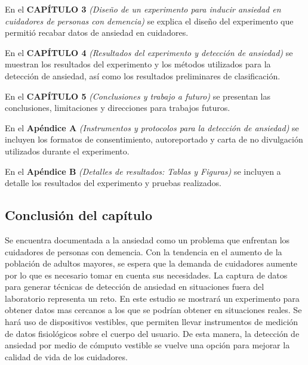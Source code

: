 	En el \textbf{CAP\'ITULO 3} \textit{(Dise\~no de un experimento para inducir ansiedad en cuidadores de personas con demencia)} se explica el dise\~no del experimento que permiti\'o recabar datos de ansiedad en cuidadores.

	En el \textbf{CAP\'ITULO 4} \textit{(Resultados del experimento y detecci\'on de ansiedad)} se muestran los resultados del experimento y los m\'etodos utilizados para la detecci\'on de ansiedad, as\'i como los resultados preliminares de clasificaci\'on.

	En el \textbf{CAP\'ITULO 5} \textit{(Conclusiones y trabajo a futuro)} se presentan las conclusiones, limitaciones y direcciones para trabajos futuros.

	En el \textbf{Ap\'endice A} \textit{(Instrumentos y protocolos para la detecci\'on de ansiedad)} se incluyen los formatos de consentimiento, autoreportado y carta de no divulgaci\'on utilizados durante el experimento.

	En el \textbf{Ap\'endice B} \textit{(Detalles de resultados: Tablas y Figuras)} se incluyen a detalle los resultados del experimento y pruebas realizados.


\subsection{Conclusi\'on del cap\'itulo}
	Se encuentra documentada a la ansiedad como un problema que enfrentan los cuidadores de personas con demencia. Con la tendencia en el aumento de la poblaci\'on de adultos mayores, se espera que la demanda de cuidadores aumente por lo que es necesario tomar en cuenta sus necesidades. La captura de datos para generar t\'ecnicas de detecci\'on de ansiedad en situaciones fuera del laboratorio representa un reto. En este estudio se mostrar\'a un experimento para obtener datos mas cercanos a los que se podr\'ian obtener en situaciones reales. Se har\'a uso de dispositivos vestibles, que permiten llevar instrumentos de medici\'on de datos fisiol\'ogicos sobre el cuerpo del usuario. De esta manera, la detecci\'on de ansiedad por medio de c\'omputo vestible se vuelve una opci\'on para mejorar la calidad de vida de los cuidadores.
\newpage
